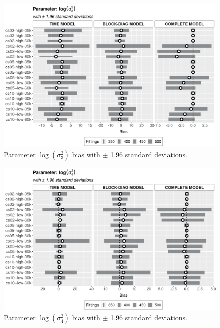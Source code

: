 \documentclass[a4paper,12pt]{article}
\begin{document}
\begin{figure}[H]
 \centering
 \includegraphics[width=\linewidth]{../../THESIS/thesis/figures/bias2plotsd-9.png}
 \vspace{-0.75cm}
 \caption{Parameter \(\log(\sigma_{3}^{2})\) bias with \(\pm\) 1.96
   standard deviations.}
 \label{fig:biassdlogs2_3}
\end{figure}

\begin{figure}[H]
 \centering
 \includegraphics[width=\linewidth]{../../THESIS/thesis/figures/bias2plotsd-10.png}
 \vspace{-0.75cm}
 \caption{Parameter \(\log(\sigma_{4}^{2})\) bias with \(\pm\) 1.96
   standard deviations.}
 \label{fig:biassdlogs2_4}
\end{figure}
\end{document}
